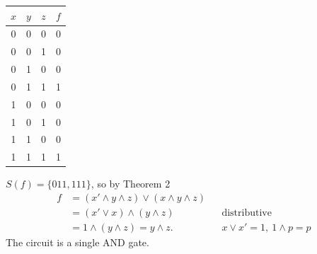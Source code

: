 \documentclass{fkt-notes}
\theoremstyle{definition}
\begin{document}
\begin{example}
  \leavevmode\par\noindent
  \begin{minipage}[t]{0.25\textwidth}
    \small
    \begin{tabular}{@{}ccc|c@{}}
      $x$ & $y$ & $z$ & $f$ \\\hline
      0   & 0   & 0   & 0   \\ 0&0&1&0\\ 0&1&0&0\\ 0&1&1&1\\
      1   & 0   & 0   & 0   \\ 1&0&1&0\\ 1&1&0&0\\ 1&1&1&1
    \end{tabular}
  \end{minipage}\hfill
  \begin{minipage}[t]{0.72\textwidth}
    $S(f)=\{011,111\}$, so by Theorem 2
    \begin{align*}
      f & =(x'\wedge y\wedge z)\vee(x\wedge y\wedge z)                               \\
        & =(x'\vee x)\wedge(y\wedge z)                 &  & \text{distributive}      \\
        & =1\wedge(y\wedge z)=y\wedge z.               &  & x\vee x'=1,\ 1\wedge p=p
    \end{align*}
    The circuit is a single AND gate.
  \end{minipage}
\end{example}
\end{document}
